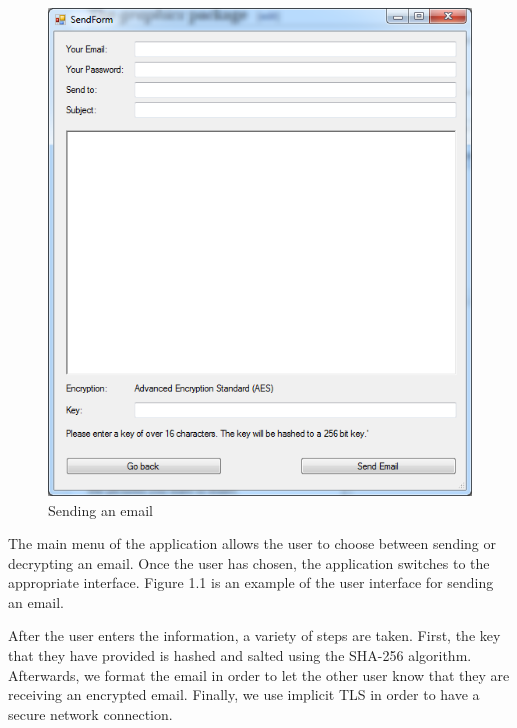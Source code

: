 \documentclass[a4paper,twoside,10pt]{report}
\begin{document}
\begin{figure}[h]
	\centering
	\includegraphics[scale=0.6]{2}
	\caption{Sending an email}
\end{figure}

The main menu of the application allows the user to choose between sending or decrypting an email. Once the user has chosen, the application switches to the appropriate interface. Figure 1.1 is an example of the user interface for sending an email.

\vspace{2.5mm}

After the user enters the information, a variety of steps are taken. First, the key that they have provided is hashed and salted using the SHA-256 algorithm. Afterwards, we format the email in order to let the other user know that they are receiving an encrypted email. Finally, we use implicit TLS in order to have a secure network connection.

\vspace{2.5mm}
\end{document}
